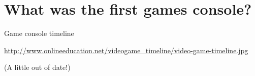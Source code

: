 \part{What was the first games console?}
\frame{\partpage}


\begin{frame}{Game console timeline}
	\begin{center}
		\url{http://www.onlineeducation.net/videogame_timeline/video-game-timeline.jpg}
		
		(A little out of date!)
	\end{center}
\end{frame}
